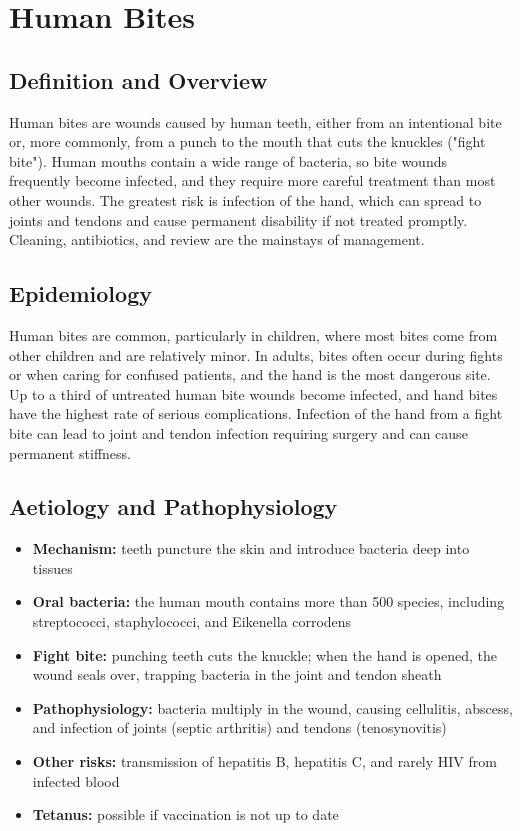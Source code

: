 \chapter{Human Bites}

\section*{Definition and Overview}
Human bites are wounds caused by human teeth, either from an intentional bite or, more commonly, from a punch to the mouth that cuts the knuckles ("fight bite"). Human mouths contain a wide range of bacteria, so bite wounds frequently become infected, and they require more careful treatment than most other wounds. The greatest risk is infection of the hand, which can spread to joints and tendons and cause permanent disability if not treated promptly. Cleaning, antibiotics, and review are the mainstays of management.

\section*{Epidemiology}
Human bites are common, particularly in children, where most bites come from other children and are relatively minor. In adults, bites often occur during fights or when caring for confused patients, and the hand is the most dangerous site. Up to a third of untreated human bite wounds become infected, and hand bites have the highest rate of serious complications. Infection of the hand from a fight bite can lead to joint and tendon infection requiring surgery and can cause permanent stiffness.

\section*{Aetiology and Pathophysiology}
\begin{itemize}
    \item \textbf{Mechanism:} teeth puncture the skin and introduce bacteria deep into tissues
    \item \textbf{Oral bacteria:} the human mouth contains more than 500 species, including streptococci, staphylococci, and Eikenella corrodens
    \item \textbf{Fight bite:} punching teeth cuts the knuckle; when the hand is opened, the wound seals over, trapping bacteria in the joint and tendon sheath
    \item \textbf{Pathophysiology:} bacteria multiply in the wound, causing cellulitis, abscess, and infection of joints (septic arthritis) and tendons (tenosynovitis)
    \item \textbf{Other risks:} transmission of hepatitis B, hepatitis C, and rarely HIV from infected blood
    \item \textbf{Tetanus:} possible if vaccination is not up to date
\end{itemize}

